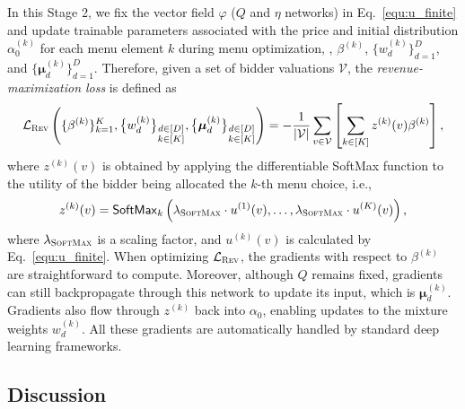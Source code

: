 In this Stage 2, we fix the vector field $\varphi$ ($Q$ and $\eta$ networks) in Eq.~\ref{equ:u_finite} and update trainable parameters associated with the price and 
initial distribution $\alpha_0^{(k)}$ for each menu element $k$ 
during menu optimization, \ie, $\beta^{(k)}$, $\{w^{(k)}_d\}_{d=1}^{D}$, and $\{\bm\mu^{(k)}_d\}_{d=1}^{D}$. Therefore, given a set of bidder valuations $\mathcal{V}$,
the {\em revenue-maximization loss} is defined as
%
\begin{align}
    \mathcal{L}_{\textsc{Rev}}\left(\{\beta^{(k)}\}_{k=1}^K, \bigl\{ w_d^{(k)} \bigr\}_{\substack{d\in[D] \\ k\in[K]}},\bigl\{\bm\mu_d^{(k)} \bigr\}_{\substack{d\in[D] \\ k\in[K]}}\right) = -\frac{1}{|\mathcal{V}|}\sum_{v\in \mathcal{V}}\left[\sum_{k\in[K]}z^{(k)}(v)\beta^{(k)} \right],
\end{align}
%
where $z^{(k)}(v)$ is obtained by applying the differentiable SoftMax function to the utility of the bidder being allocated the $k$-th menu choice, i.e.,
%
\begin{align}
    z^{(k)}(v) = \mathsf{SoftMax}_k\left(\lambda_{\textsc{SoftMax}}\cdot u^{(1)}(v),\ldots,\lambda_{\textsc{SoftMax}}\cdot u^{(K)}(v)\right),\label{equ:softmax_in_loss}
\end{align}
%
where $\lambda_{\textsc{SoftMax}}$ is a scaling factor, and $u^{(k)}(v)$ is calculated by Eq.~\ref{equ:u_finite}.
When optimizing $\mathcal{L}_{\textsc{Rev}}$, the gradients with respect to $\beta^{(k)}$ are straightforward to compute. Moreover, although $Q$ remains fixed, gradients can still backpropagate through this network to update its input,
which is $\bm\mu^{(k)}_d$. Gradients also flow through $z^{(k)}$ back into $\alpha_0$, enabling updates to the mixture weights $w^{(k)}_d$. All these gradients are automatically handled by standard deep learning frameworks.




\subsection{Discussion}\label{sec:multi-bidder}

